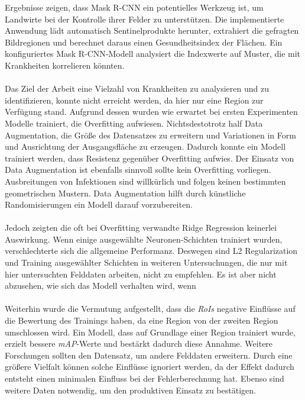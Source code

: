 Ergebnisse zeigen, dass Mask R-CNN ein potentielles Werkzeug ist, um Landwirte bei der Kontrolle ihrer Felder zu unterstützen. Die implementierte Anwendung lädt automatisch Sentinelprodukte herunter, extrahiert die gefragten Bildregionen und berechnet daraus einen Gesundheitsindex der Flächen. Ein konfiguriertes Mask R-CNN-Modell analysiert die Indexwerte auf Muster, die mit Krankheiten korrelieren könnten. 
\\\\
Das Ziel der Arbeit eine Vielzahl von Krankheiten zu analysieren und zu identifizieren, konnte nicht erreicht werden, da hier nur eine Region zur Verfügung stand. Aufgrund dessen wurden wie erwartet bei ersten Experimenten Modelle trainiert, die Overfitting aufwiesen. Nichtsdestotrotz half Data Augmentation, die Größe des Datensatzes zu erweitern und Variationen in Form und Ausrichtung der Ausgangsfläche zu erzeugen. Dadurch konnte ein Modell trainiert werden, dass Resistenz gegenüber Overfitting aufwies. Der Einsatz von Data Augmentation ist ebenfalls sinnvoll sollte kein Overfitting vorliegen. Ausbreitungen von Infektionen sind willkürlich und folgen keinen bestimmten geometrischen Mustern. Data Augmentation hilft durch künstliche Randomisierungen ein Modell darauf vorzubereiten.
\\\\
Jedoch zeigten die oft bei Overfitting verwandte Ridge Regression keinerlei Auswirkung. Wenn einige ausgewählte Neuronen-Schichten trainiert wurden, verschlechterte sich die allgemeine Performanz. Deswegen sind L2 Regularization und Training ausgewählter Schichten in weiteren Untersuchungen, die nur mit hier untersuchten Felddaten arbeiten, nicht zu empfehlen. Es ist aber nicht abzusehen, wie sich das Modell verhalten wird, wenn 
\\\\
Weiterhin wurde die Vermutung aufgestellt, dass die \textit{RoIs} negative Einflüsse auf die Bewertung des Trainings haben, da eine Region von der zweiten Region umschlossen wird. Ein Modell, dass auf Grundlage einer Region trainiert wurde, erzielt bessere \textit{mAP}-Werte und bestärkt dadurch diese Annahme. Weitere Forschungen sollten den Datensatz, um andere Felddaten erweitern. Durch eine größere Vielfalt können solche Einflüsse ignoriert werden, da der Effekt dadurch entsteht einen minimalen Einfluss bei der Fehlerberechnung hat. Ebenso sind weitere Daten notwendig, um den produktiven Einsatz zu bestätigen.
